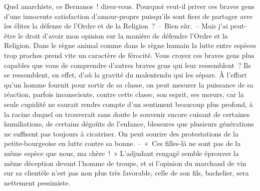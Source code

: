 \documentclass[french,twoside]{book} %
\begin{document}
\noindent Quel anarchiste, ce Bernanos ! direz-vous. Pourquoi veut-il priver ces braves gens d’une innocente satisfaction d’amour-propre puisqu’ils sont fiers de partager avec les élites la défense de l’Ordre et de la Religion ? – Bien sûr. – Mais j’ai peut-être le droit d’avoir mon opinion sur la manière de défendre l’Ordre et la Religion. Dans le règne animal comme dans le règne humain la lutte entre espèces trop proches prend vite un caractère de férocité. Vous croyez ces braves gens plus capables que vous de comprendre d’autres braves gens qui leur ressemblent ? Ils se ressemblent, en effet, d’où la gravité du malentendu qui les sépare. À l’effort qu’un homme fournit pour sortir de sa classe, on peut mesurer la puissance de sa réaction, parfois inconsciente, contre cette classe, son esprit, ses mœurs, car la seule cupidité ne saurait rendre compte d’un sentiment beaucoup plus profond, à la racine duquel on trouverait sans doute le souvenir encore cuisant de certaines humiliations, de certains dégoûts de l’enfance, blessures que plusieurs générations ne suffisent pas toujours à cicatriser. On peut sourire des protestations de la petite-bourgeoise en lutte contre sa bonne. – « Ces filles-là ne sont pas de la même espèce que nous, ma chère ! » L’adjudant rengagé semble éprouver la même déception devant l’homme de troupe, et si l’opinion du marchand de vin sur sa clientèle n’est pas non plus très favorable, celle de son fils, bachelier, sera nettement pessimiste.\par
\bigbreak
\end{document}
